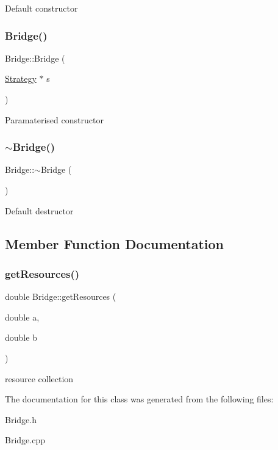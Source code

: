 Default constructor \mbox{\label{classBridge_a31994152fc209370604140c3591339c9}} 
\subsubsection{\texorpdfstring{Bridge()}{Bridge()}\hspace{0.1cm}{\footnotesize\ttfamily [2/2]}}
{\footnotesize\ttfamily Bridge\+::\+Bridge (\begin{DoxyParamCaption}\item[{\hyperlink{classStrategy}{Strategy} $\ast$}]{s }\end{DoxyParamCaption})}

Paramaterised constructor \mbox{\label{classBridge_a812b325fbb4f4b589e68f11f443a7ee4}} 
\subsubsection{\texorpdfstring{$\sim$\+Bridge()}{~Bridge()}}
{\footnotesize\ttfamily Bridge\+::$\sim$\+Bridge (\begin{DoxyParamCaption}{ }\end{DoxyParamCaption})}

Default destructor 

\subsection{Member Function Documentation}
\mbox{\label{classBridge_a1508c1c9cfb44850fea31afcb7f1e403}} 
\subsubsection{\texorpdfstring{get\+Resources()}{getResources()}}
{\footnotesize\ttfamily double Bridge\+::get\+Resources (\begin{DoxyParamCaption}\item[{double}]{a,  }\item[{double}]{b }\end{DoxyParamCaption})}

resource collection 

The documentation for this class was generated from the following files\+:\begin{DoxyCompactItemize}
\item 
Bridge.\+h\item 
Bridge.\+cpp\end{DoxyCompactItemize}
